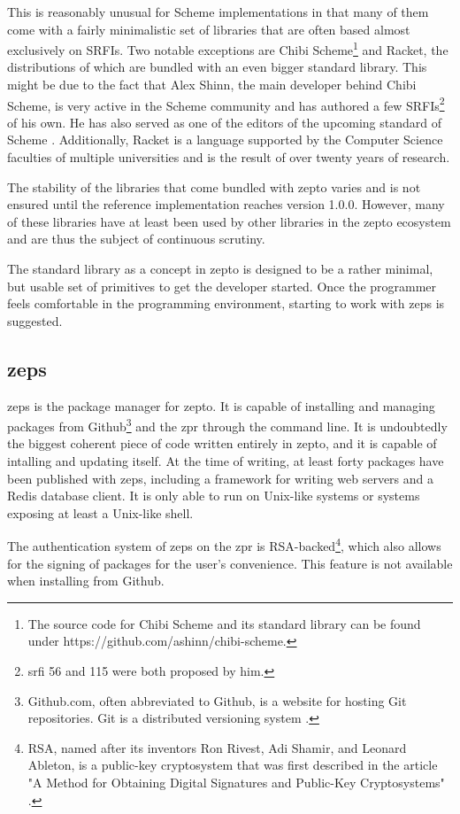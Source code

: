 \documentclass[oneside,11pt,xetex]{scrbook}
\begin{document}
This is reasonably unusual for Scheme implementations in that many of them
come with a fairly minimalistic set of libraries that are often based almost
exclusively on SRFIs. Two notable exceptions are Chibi Scheme\footnote{The source
code for Chibi Scheme and its standard library can be found under
https://github.com/ashinn/chibi-scheme.} and Racket, the distributions of which
are bundled with an even bigger standard library. This might be due to the fact
that Alex Shinn, the main developer behind Chibi Scheme, is very active in the
Scheme community and has authored a few SRFIs\footnote{\gls{srfi} 56 \parencite{SRFI56}
and 115 \parencite{SRFI115} were both proposed by him.} of his own. He has also served
as one of the editors of the upcoming standard of Scheme \parencite{R7RS}.
Additionally, Racket is a language supported by the Computer Science faculties of
multiple universities and is the result of over twenty years of research.

The stability of the libraries that come bundled with zepto varies and is not
ensured until the reference implementation reaches version 1.0.0. However, many
of these libraries have at least been used by other libraries in the zepto
ecosystem and are thus the subject of continuous scrutiny.

The standard library as a concept in zepto is designed to be a rather minimal,
but usable set of primitives to get the developer started. Once the programmer
feels comfortable in the programming environment, starting to work with \gls{zeps}
is suggested.

\subsection{\gls{zeps}}

\gls{zeps} is the package manager for zepto. It is capable of installing and
managing packages from Github\footnote{Github.com, often abbreviated to Github,
is a website for hosting Git repositories. Git is a distributed versioning system
\parencite{GIT}.} and the \gls{zpr} through the command line. It
is undoubtedly the biggest coherent piece of code written entirely in zepto,
and it is capable of intalling and updating itself. At the time of writing,
at least forty packages have been published with \gls{zeps}, including a framework
for writing web servers and a Redis database client. It is only able to run
on Unix-like systems or systems exposing at least a Unix-like shell.

The authentication system of \gls{zeps} on the \gls{zpr} is RSA-backed\footnote{RSA,
named after its inventors Ron Rivest, Adi Shamir, and Leonard Ableton, is a public-key
cryptosystem that was first described in the article "A Method for Obtaining Digital
Signatures and Public-Key Cryptosystems" \parencite{RSA}.}, which
also allows for the signing of packages for the user's convenience. This feature
is not available when installing from Github.
\end{document}
